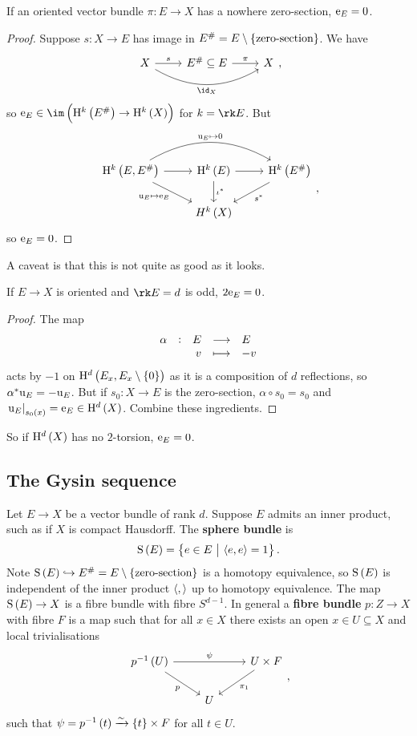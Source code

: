 \begin{lemma}
If an oriented vector bundle $ \pi : E \to X $ has a nowhere zero-section, $ \mathrm{e}_E = 0 $.
\end{lemma}

\begin{proof}
Suppose $ s : X \to E $ has image in $ E^\# = E \setminus \cbr{\text{zero-section}} $. We have
$$
\begin{tikzcd}
X \arrow{r}{s} \arrow[bend right=30]{rr}[swap]{\id_X} & E^\# \subseteq E \arrow{r}{\pi} & X
\end{tikzcd},
$$
so $ \e_E \in \im \br{\H^k\br{E^\#} \to \H^k\br{X}} $ for $ k = \rk E $. But
$$
\begin{tikzcd}
\H^k\br{E, E^\#} \arrow{r} \arrow[bend left=30]{rr}{\u_E \mapsto 0} \arrow{dr}[swap]{\u_E \mapsto \e_E} & \H^k\br{E} \arrow{r} \arrow{d}{\iota^*} & \H^k\br{E^\#} \arrow{dl}{s^*} \\
& H^k\br{X} &
\end{tikzcd},
$$
so $ \mathrm{e}_E = 0 $.
\end{proof}

A caveat is that this is not quite as good as it looks.

\begin{lemma}
If $ E \to X $ is oriented and $ \rk E = d $ is odd, $ 2\mathrm{e}_E = 0 $.
\end{lemma}

\begin{proof}
The map
$$ \function[\alpha]{E}{E}{v}{-v} $$
acts by $ -1 $ on $ \H^d\br{E_x, E_x \setminus \cbr{0}} $ as it is a composition of $ d $ reflections, so $ \alpha^*\mathrm{u}_E = -\mathrm{u}_E $. But if $ s_0 : X \to E $ is the zero-section, $ \alpha \circ s_0 = s_0 $ and $ \eval{\u_E}_{s_0\br{x}} = \e_E \in \H^d\br{X} $. Combine these ingredients.
\end{proof}

So if $ \H^d\br{X} $ has no $ 2 $-torsion, $ \mathrm{e}_E = 0 $.

\subsection{The Gysin sequence}

Let $ E \to X $ be a vector bundle of rank $ d $. Suppose $ E $ admits an inner product, such as if $ X $ is compact Hausdorff. The \textbf{sphere bundle} is
$$ \S\br{E} = \cbr{e \in E \st \abr{e, e} = 1}. $$
Note $ \S\br{E} \hookrightarrow E^\# = E \setminus \cbr{\text{zero-section}} $ is a homotopy equivalence, so $ \S\br{E} $ is independent of the inner product $ \left\langle , \right\rangle $ up to homotopy equivalence. The map $ \S\br{E} \to X $ is a fibre bundle with fibre $ S^{d - 1} $. In general a \textbf{fibre bundle} $ p : Z \to X $ with fibre $ F $ is a map such that for all $ x \in X $ there exists an open $ x \in U \subseteq X $ and local trivialisations
$$
\begin{tikzcd}
p^{-1}\br{U} \arrow{rr}{\psi} \arrow{dr}[swap]{p} & & U \times F \arrow{dl}{\pi_1} \\
& U &
\end{tikzcd},
$$
such that $ \psi = p^{-1}\br{t} \xrightarrow{\sim} \cbr{t} \times F $ for all $ t \in U $.


